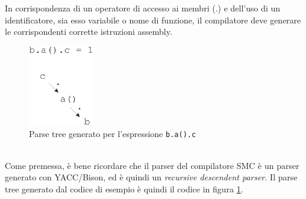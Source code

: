 \documentclass[a4paper, 11pt]{article}
\newcommand{\code}[1]{\scriptsize{\texttt{#1}}\normalsize}
\begin{document}
In corrispondenza di un operatore di accesso ai membri (.) e dell'uso di un identificatore, sia esso variabile o nome di funzione, il compilatore deve generare le corrispondenti corrette istruzioni assembly. 
\begin{figure}[ht]
\centering
\includegraphics[width=0.25\textwidth]{identuse.eps}
\caption{Parse tree generato per l'espressione \code{b.a().c}}
\label{fig:identuse}
\end{figure}
\\
Come premessa, \`e bene ricordare che il parser del compilatore SMC \`e un parser generato con YACC/Bison, ed \`e quindi un \emph{recursive descendent parser}. Il parse tree generato dal codice di esempio \`e quindi il codice in figura \ref{fig:identuse}.
\end{document}
